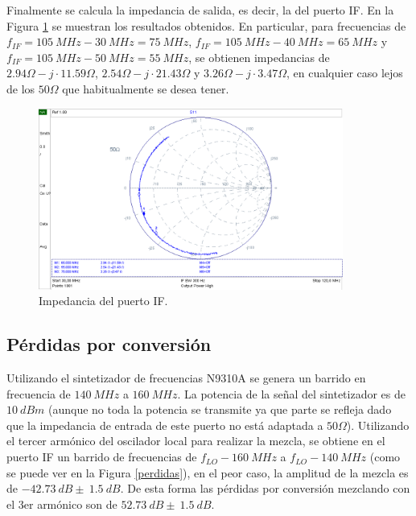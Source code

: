 \documentclass[a4paper,10pt]{article}
\begin{document}
	\indent Finalmente se calcula la impedancia de salida, es decir, la del 
	puerto IF. En la Figura \ref{impedancia3} se muestran los resultados 
	obtenidos. En particular, para  frecuencias de 
	$f_{IF}=105~MHz-30~MHz=75~MHz$, $f_{IF}=105~MHz-40~MHz=65~MHz$ y 
	$f_{IF}=105~MHz-50~MHz=55~MHz$, se obtienen impedancias de 
	$2.94\Omega-j\cdot11.59\Omega$, $2.54\Omega-j\cdot21.43\Omega$ y 
	$3.26\Omega-j\cdot3.47\Omega$, en cualquier caso lejos de los $50\Omega$ que
	habitualmente se desea tener.
	
	\begin{figure}[!htb]
		\centering
		\includegraphics[width=10cm]{Images/impedanciaIF.png}
		\caption{Impedancia del puerto IF.}
		\label{impedancia3}
	\end{figure}			
	
	\subsection{P\'erdidas por conversi\'on}
	\indent Utilizando el sintetizador de frecuencias N9310A se genera un 
	barrido en frecuencia de $140~MHz$ a $160~MHz$. La potencia de la se\~nal 
	del sintetizador es de $10~dBm$ (aunque no toda la potencia se transmite ya 
	que parte se refleja dado que la impedancia de entrada de este puerto no 
	est\'a adaptada a $50\Omega$). Utilizando el tercer arm\'onico del oscilador
	local para realizar la mezcla, se obtiene en el puerto IF un barrido de 
	frecuencias de $f_{LO}-160~MHz$ a $f_{LO}-140~MHz$ (como se puede ver en la 
	Figura \ref{perdidas}), en el peor caso, la amplitud de la mezcla es de 
	$-42.73~dB\pm~1.5~dB$. De esta forma las p\'erdidas por conversi\'on 
	mezclando con el 3er arm\'onico son de $52.73~dB\pm~1.5~dB$.
	
\end{document}
